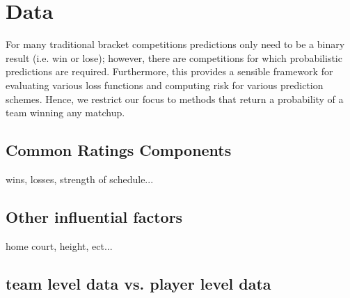 \section{Data}
For many traditional bracket competitions predictions only need to be a binary result (i.e. win or lose); however, there are competitions for which probabilistic predictions  are required.  Furthermore, this provides a sensible framework for evaluating various loss functions and computing risk for various prediction schemes.  Hence, we restrict our focus to methods that return a probability of a team winning any matchup.
\subsection{Common Ratings Components} wins, losses, strength of schedule...

\subsection{Other influential factors} home court, height, ect...
\subsection{team level data vs. player level data}
